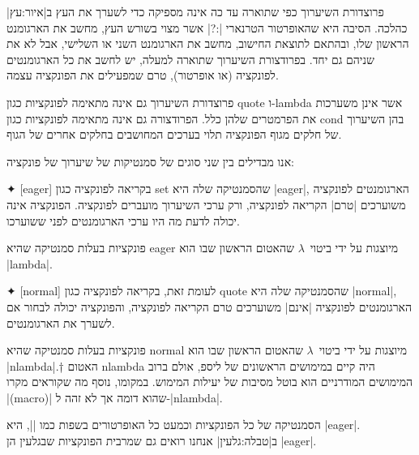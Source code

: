 \documentclass[a4paper,12pt,reqno]{article}
\begin{document}
פרוצדורת השיערוך כפי שתוארה עד כה אינה מספיקה כדי לשערך
את העץ ב|איור:עץ| כהלכה. הסיבה היא שהאופרטור הטרנארי \T|:?| אשר מצוי בשורש
העץ, מחשב את הארגומנט הראשון שלו, ובהתאם לתוצאת החישוב, מחשב את הארגומנט השני
או השלישי, אבל לא את שניהם גם יחד. בפרודצורת השיערוך שתוארה למעלה, יש לחשב את
כל הארגומנטים לפונקציה (או אופרטור), טרם שמפעילים את הפונקציה עצמה.

פרוצדורת השיערוך גם אינה מתאימה לפונקציות כגון quote ו-lambda אשר אינן משערכות
את הפרמטרים שלהן כלל. הפרודצורה גם אינה מתאימה לפונקציות כגון cond בהן השיערוך
של חלקים מגוף הפונקציה תלוי בערכים המחושבים בחלקים אחרים של הגוף.

אנו מבדילים בין שני סוגים של סמנטיקות של שיערוך של פונקציה:
\begin{description}
  ✦ [eager] בקריאה לפונקציה כגון set שהסמנטיקה שלה היא \E|eager|, הארגומנטים
  לפונקציה משוערכים \ע|טרם| הקריאה לפונקציה, ורק ערכי השיערוך מועברים לפונקציה.
  הפונקציה אינה יכולה לדעת מה היו ערכי הארגומנטים לפני ששוערכו.

  פונקציות בעלות סמנטיקה שהיא eager מיוצגות על ידי ביטוי~$λ$ שהאטום הראשון שבו
  הוא \T|lambda|.

  ✦ [normal] לעומת זאת, בקריאה לפונקציה כגון quote שהסמנטיקה שלה היא
  \E|normal|, הארגומנטים לפונקציה \ע|אינם| משוערכים טרם הקריאה לפונקציה,
  והפונקציה יכולה לבחור אם לשערך את הארגומנטים.

  פונקציות בעלות סמנטיקה שהיא normal מיוצגות על ידי ביטוי~$λ$ שהאטום הראשון שבו
  הוא \T|nlambda|.†{
  האטום nlambda היה קיים במימושים הראשונים של ליספ, אולם ברוב המימושים המודרניים
  הוא בוטל מסיבות של יעילות המימוש.  במקומו, נוסף מה שקוראים מקרו \E|(macro)|
  שהוא דומה אך לא זהה ל-\E|nlambda|.}

\end{description}

הסמנטיקה של כל הפונקציות וכמעט כל האופרטורים בשפות כמו \E|\CPL|, היא \E|eager|.
ב|טבלה:גלעין| אנחנו רואים גם שמרבית הפונקציות שבגלעין הן \E|eager|.
\end{document}
